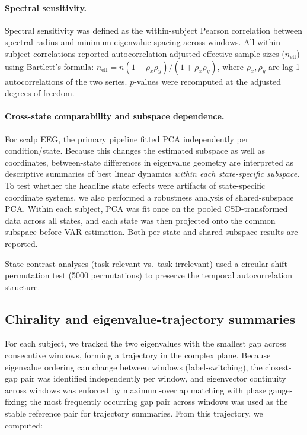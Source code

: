 \documentclass[preprint,12pt,nonatbib]{elsarticle}
\begin{document}
\paragraph{Spectral sensitivity.} Spectral sensitivity was defined as the within-subject Pearson correlation between spectral radius and minimum eigenvalue spacing across windows. All within-subject correlations reported autocorrelation-adjusted effective sample sizes ($n_\mathrm{eff}$) using Bartlett's formula: $n_\mathrm{eff} = n(1-\rho_x\rho_y)/(1+\rho_x\rho_y)$, where $\rho_x,\rho_y$ are lag-1 autocorrelations of the two series. $p$-values were recomputed at the adjusted degrees of freedom.

\paragraph{Cross-state comparability and subspace dependence.} For scalp EEG, the primary pipeline fitted PCA independently per condition/state. Because this changes the estimated subspace as well as coordinates, between-state differences in eigenvalue geometry are interpreted as descriptive summaries of best linear dynamics \emph{within each state-specific subspace}. To test whether the headline state effects were artifacts of state-specific coordinate systems, we also performed a robustness analysis of shared-subspace PCA. Within each subject, PCA was fit once on the pooled CSD-transformed data across all states, and each state was then projected onto the common subspace before VAR estimation. Both per-state and shared-subspace results are reported.

State-contrast analyses (task-relevant vs.\ task-irrelevant) used a circular-shift permutation test (5000 permutations) to preserve the temporal autocorrelation structure.

\subsection{Chirality and eigenvalue-trajectory summaries}

For each subject, we tracked the two eigenvalues with the smallest gap across consecutive windows, forming a trajectory in the complex plane. Because eigenvalue ordering can change between windows (label-switching), the closest-gap pair was identified independently per window, and eigenvector continuity across windows was enforced by maximum-overlap matching with phase gauge-fixing; the most frequently occurring gap pair across windows was used as the stable reference pair for trajectory summaries. From this trajectory, we computed:
\end{document}
